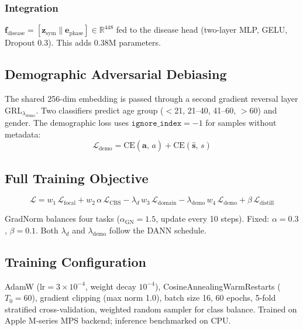 \documentclass[journal]{IEEEtran}
\newcommand{\R}{\mathbb{R}}
\newcommand{\Lc}{\mathcal{L}}
\begin{document}
\subsubsection{Integration}
$\mathbf{f}_\text{disease} = [\mathbf{z}_\text{sym} \| \mathbf{e}_\text{phase}] \in \R^{448}$
fed to the disease head (two-layer MLP, GELU, Dropout 0.3).
This adds 0.38M parameters.

\subsection{Demographic Adversarial Debiasing}
\label{sec:demo}

The shared 256-dim embedding is passed through a second gradient
reversal layer $\mathrm{GRL}_{\lambda_\text{demo}}$. Two classifiers
predict age group ($<$21, 21--40, 41--60, $>$60) and gender.
The demographic loss uses $\texttt{ignore\_index}{=}{-1}$ for samples
without metadata:
\begin{equation}
\Lc_\text{demo} = \mathrm{CE}(\hat{\mathbf{a}},\, a)
                + \mathrm{CE}(\hat{\mathbf{s}},\, s)
\label{eq:demo_loss}
\end{equation}

\subsection{Full Training Objective}
\label{sec:objective}

\begin{equation}
\Lc = w_1\,\Lc_\text{focal}
    + w_2\,\alpha\,\Lc_\text{CBS}
    - \lambda_d\,w_3\,\Lc_\text{domain}
    - \lambda_\text{demo}\,w_4\,\Lc_\text{demo}
    + \beta\,\Lc_\text{distill}
\label{eq:total}
\end{equation}

GradNorm balances four tasks ($\alpha_\text{GN}{=}1.5$, update every 10 steps).
Fixed: $\alpha{=}0.3$, $\beta{=}0.1$. Both $\lambda_d$ and
$\lambda_\text{demo}$ follow the DANN schedule.

\subsection{Training Configuration}

AdamW ($\mathrm{lr}{=}3\times10^{-4}$, weight decay $10^{-4}$),
CosineAnnealingWarmRestarts ($T_0{=}60$), gradient clipping
(max norm 1.0), batch size 16, 60 epochs, 5-fold stratified
cross-validation, weighted random sampler for class balance.
Trained on Apple M-series MPS backend; inference benchmarked on CPU.
\end{document}
